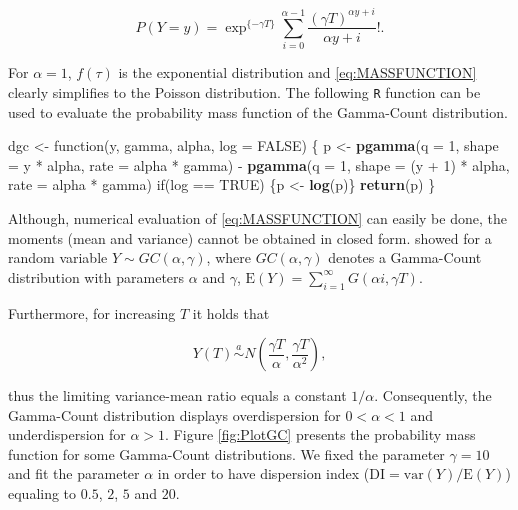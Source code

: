 \documentclass[9pt,a5paper,]{book}
\newenvironment{Shaded}{}{}
\newcommand{\KeywordTok}[1]{\textbf{{#1}}}
\newcommand{\DataTypeTok}[1]{\underline{{#1}}}
\newcommand{\DecValTok}[1]{{#1}}
\newcommand{\StringTok}[1]{{#1}}
\newcommand{\OtherTok}[1]{{#1}}
\newcommand{\NormalTok}[1]{{#1}}
\renewenvironment{Shaded}{\color{inputcolor}}{}
\renewcommand{\DataTypeTok}[1]{{#1}}
\theoremstyle{definition}
\theoremstyle{definition}
\theoremstyle{remark}
\begin{document}
\begin{equation}
P(Y = y) = \exp^{\{-\gamma T\}} \sum_{i = 0}^{\alpha -1} \frac{(\gamma T)^{\alpha y + i}}{\alpha y + i}!.
\end{equation}

For \(\alpha = 1\), \(f(\tau)\) is the exponential distribution and
\eqref{eq:MASSFUNCTION} clearly simplifies to the Poisson distribution.
The following \texttt{R} function can be used to evaluate the
probability mass function of the Gamma-Count distribution.

\begin{Shaded}
\begin{Highlighting}[]
\NormalTok{dgc <-}\StringTok{ }\NormalTok{function(y, gamma, alpha, }\DataTypeTok{log =} \OtherTok{FALSE}\NormalTok{) \{}
  \NormalTok{p <-}\StringTok{ }\KeywordTok{pgamma}\NormalTok{(}\DataTypeTok{q =} \DecValTok{1}\NormalTok{,}
              \DataTypeTok{shape =} \NormalTok{y *}\StringTok{ }\NormalTok{alpha,}
              \DataTypeTok{rate =} \NormalTok{alpha *}\StringTok{ }\NormalTok{gamma) -}
\StringTok{    }\KeywordTok{pgamma}\NormalTok{(}\DataTypeTok{q =} \DecValTok{1}\NormalTok{,}
           \DataTypeTok{shape =} \NormalTok{(y +}\StringTok{ }\DecValTok{1}\NormalTok{) *}\StringTok{ }\NormalTok{alpha,}
           \DataTypeTok{rate =} \NormalTok{alpha *}\StringTok{ }\NormalTok{gamma)}
  \NormalTok{if(log ==}\StringTok{ }\OtherTok{TRUE}\NormalTok{) \{p <-}\StringTok{ }\KeywordTok{log}\NormalTok{(p)\}}
  \KeywordTok{return}\NormalTok{(p)}
\NormalTok{\}}
\end{Highlighting}
\end{Shaded}

Although, numerical evaluation of \eqref{eq:MASSFUNCTION} can easily be
done, the moments (mean and variance) cannot be obtained in closed form.
\citet{Winkelman1995} showed for a random variable
\(Y \sim GC(\alpha, \gamma)\), where \(GC(\alpha, \gamma)\) denotes a
Gamma-Count distribution with parameters \(\alpha\) and \(\gamma\),
\(\mathrm{E}(Y) = \sum_{i = 1}^\infty G(\alpha i, \gamma T)\).

Furthermore, for increasing \(T\) it holds that

\begin{equation}
Y(T) \overset{a}{\sim} N\left(\frac{\gamma T}{\alpha}, \frac{\gamma T}{\alpha^2} \right),
\end{equation}

thus the limiting variance-mean ratio equals a constant \(1/\alpha\).
Consequently, the Gamma-Count distribution displays overdispersion for
\(0 < \alpha < 1\) and underdispersion for \(\alpha > 1\). Figure
\ref{fig:PlotGC} presents the probability mass function for some
Gamma-Count distributions. We fixed the parameter \(\gamma = 10\) and
fit the parameter \(\alpha\) in order to have dispersion index
(\(\mathrm{DI} = \mathrm{var}(Y)/\mathrm{E}(Y)\)) equaling to \(0.5\),
\(2\), \(5\) and \(20\).
\end{document}
